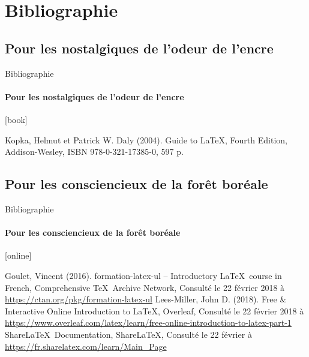 \scriptsize

\section{Bibliographie}

\subsection{Pour les nostalgiques de l'odeur de l'encre}

\begin{frame}{Bibliographie}
	\framesubtitle{Pour les nostalgiques de l'odeur de l'encre}
	[book]
		
	\begin{thebibliography}{99}		
			Kopka, Helmut et Patrick W. Daly (2004).
			\newblock Guide to \LaTeX, Fourth Edition,
			\newblock Addison-Wesley,
			\newblock ISBN 978-0-321-17385-0, 597 p.		
	\end{thebibliography}

\end{frame}

\subsection{Pour les consciencieux de la forêt boréale}

\begin{frame}{Bibliographie}
	\framesubtitle{Pour les consciencieux de la forêt boréale}
	[online]
	
	\begin{thebibliography}{99}
			Goulet, Vincent (2016).
			\newblock formation-latex-ul -- Introductory \LaTeX\ course in French,
			\newblock Comprehensive \TeX\ Archive Network,
			\newblock Consulté le 22 février 2018 à \href{https://ctan.org/pkg/formation-latex-ul}{%
				https://ctan.org/pkg/formation-latex-ul}
			Lees-Miller, John D. (2018).
			\newblock Free \& Interactive Online Introduction to \LaTeX,
			\newblock Overleaf,
			\newblock Consulté le 22 février 2018 à \href{https://www.overleaf.com/latex/learn/free-online-introduction-to-latex-part-1}{%
				https://www.overleaf.com/latex/learn/free-online-introduction-to-latex-part-1}
			Share\LaTeX\ Documentation,
			\newblock Share\LaTeX,
			\newblock Consulté le 22 février à \href{https://fr.sharelatex.com/learn/Main_Page}{%
				https://fr.sharelatex.com/learn/Main\_Page}			
	\end{thebibliography}
\end{frame}